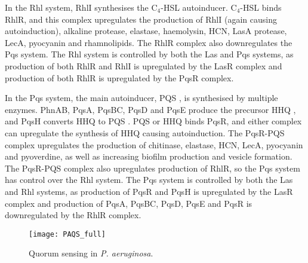 In the Rhl system, RhlI\cite{Brint1995} synthesises the C$_4$-HSL \cite{Pearson1995} autoinducer. 
C$_4$-HSL  binds RhlR\cite{Winson1995}, and this complex upregulates the production of RhlI\cite{Pesci1997} (again causing autoinduction), 
alkaline protease\cite{Latifi1995}, elastase\cite{Brint1995}, haemolysin\cite{Latifi1995}, HCN\cite{Pessi2000,Latifi1995}, LasA protease\cite{Brint1995}, LecA\cite{Winzer2000}, pyocyanin\cite{Brint1995,Latifi1995} and rhamnolipids\cite{Brint1995}.
The RhlR complex also downregulates the Pqs system\cite{McGrath2004,Wade2005}.
The Rhl system is controlled by both the Las and Pqs systems,
as production of both RhlR and RhlI is upregulated by the LasR complex\cite{Latifi1996} 
and production of both RhlR is upregulated by the PqsR complex\cite{McKnight2000}.


In the Pqs system, the main autoinducer, PQS \cite{Pesci1999}, is synthesised by multiple enzymes. 
PhnAB\cite{Farrow2007}, PqsA, PqsBC, PqsD\cite{Lepine2003,Lepine2004} and PqsE\cite{Drees2015,Lin2018} produce the precursor HHQ , and PqsH converts HHQ  to PQS . 
PQS \cite{Wade2005} or HHQ  binds PqsR\cite{Xiao2006}, and either complex can upregulate the synthesis of HHQ  causing autoinduction. 
The PqsR-PQS complex upregulates the production of 
chitinase\cite{Deziel2005}, elastase\cite{Pesci1999}, HCN\cite{Deziel2005}, LecA\cite{Diggle2003}, pyocyanin\cite{Gallagher2002,Diggle2007} and pyoverdine\cite{Diggle2007}, as well as increasing biofilm production\cite{Diggle2003} and vesicle formation\cite{Mashburn2009}.
The PqsR-PQS complex also upregulates production of RhlR, so the Pqs system has control over the Rhl system\cite{McKnight2000}.
The Pqs system is controlled by both the Las and Rhl systems,
as production of PqsR\cite{Wade2005} and PqsH\cite{Gallagher2002} is upregulated by the LasR complex and 
production of PqsA, PqsBC, PqsD, PqsE\cite{McGrath2004} and PqsR\cite{Wade2005} is downregulated by the RhlR complex.


\begin{figure}[H]
	\begin{center}
		\texttt{[image: PAQS\_full]}
		\caption{Quorum sensing in \textit{P. aeruginosa}\cite{Dubern2008,Hodgkinson2011,Jimenez2012}. \label{fgr:PA_QS}}
	\end{center}
\end{figure}

